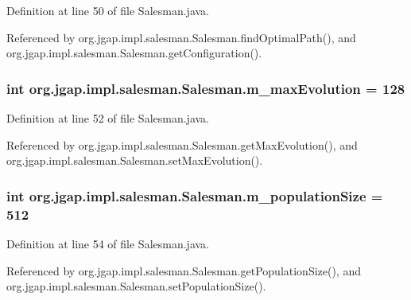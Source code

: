 Definition at line 50 of file Salesman.\-java.



Referenced by org.\-jgap.\-impl.\-salesman.\-Salesman.\-find\-Optimal\-Path(), and org.\-jgap.\-impl.\-salesman.\-Salesman.\-get\-Configuration().

\hypertarget{classorg_1_1jgap_1_1impl_1_1salesman_1_1_salesman_a6b0dae8b40df55bd71370761005d0bee}{
\subsubsection[{m\-\_\-max\-Evolution}]{\setlength{\rightskip}{0pt plus 5cm}int org.\-jgap.\-impl.\-salesman.\-Salesman.\-m\-\_\-max\-Evolution = 128\hspace{0.3cm}{\ttfamily [private]}}}\label{classorg_1_1jgap_1_1impl_1_1salesman_1_1_salesman_a6b0dae8b40df55bd71370761005d0bee}


Definition at line 52 of file Salesman.\-java.



Referenced by org.\-jgap.\-impl.\-salesman.\-Salesman.\-get\-Max\-Evolution(), and org.\-jgap.\-impl.\-salesman.\-Salesman.\-set\-Max\-Evolution().

\hypertarget{classorg_1_1jgap_1_1impl_1_1salesman_1_1_salesman_a3af54d1b6aa53b23cab72f0cdf0bf41e}{
\subsubsection[{m\-\_\-population\-Size}]{\setlength{\rightskip}{0pt plus 5cm}int org.\-jgap.\-impl.\-salesman.\-Salesman.\-m\-\_\-population\-Size = 512\hspace{0.3cm}{\ttfamily [private]}}}\label{classorg_1_1jgap_1_1impl_1_1salesman_1_1_salesman_a3af54d1b6aa53b23cab72f0cdf0bf41e}


Definition at line 54 of file Salesman.\-java.



Referenced by org.\-jgap.\-impl.\-salesman.\-Salesman.\-get\-Population\-Size(), and org.\-jgap.\-impl.\-salesman.\-Salesman.\-set\-Population\-Size().

